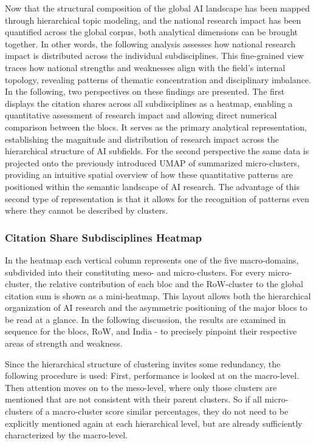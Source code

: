 \documentclass{article}
\begin{document}
	Now that the structural composition of the global AI landscape has been mapped through hierarchical topic modeling, and the national research impact has been quantified across the global corpus, both analytical dimensions can be brought together. In other words, the following analysis assesses how national research impact is distributed across the individual subdisciplines. This fine-grained view traces how national strengths and weaknesses align with the field’s internal topology, revealing patterns of thematic concentration and disciplinary imbalance. In the following, two perspectives on these findings are presented. The first displays the citation shares across all subdisciplines as a heatmap, enabling a quantitative assessment of research impact and allowing direct numerical comparison between the blocs. It serves as the primary analytical representation, establishing the magnitude and distribution of research impact across the hierarchical structure of AI subfields. For the second perspective the same data is projected onto the previously introduced UMAP of summarized micro-clusters, providing an intuitive spatial overview of how these quantitative patterns are positioned within the semantic landscape of AI research. The advantage of this second type of representation is that it allows for the recognition of patterns even where they cannot be described by clusters.
	
	\subsubsection{Citation Share Subdisciplines Heatmap}
	
	In the heatmap each vertical column represents one of the five macro-domains, subdivided into their constituting meso- and micro-clusters. For every micro-cluster, the relative contribution of each bloc and the RoW-cluster to the global citation sum is shown as a mini-heatmap. This layout allows both the hierarchical organization of AI research and the asymmetric positioning of the major blocs to be read at a glance. In the following discussion, the results are examined in sequence for the blocs, RoW, and India - to precisely pinpoint their respective areas of strength and weakness.
	
	Since the hierarchical structure of clustering invites some redundancy, the following procedure is used: First, performance is looked at on the macro-level. Then attention moves on to the meso-level, where only those clusters are mentioned that are not consistent with their parent clusters. So if all micro-clusters of a macro-cluster score similar percentages, they do not need to be explicitly mentioned again at each hierarchical level, but are already sufficiently characterized by the macro-level.
	
\end{document}
